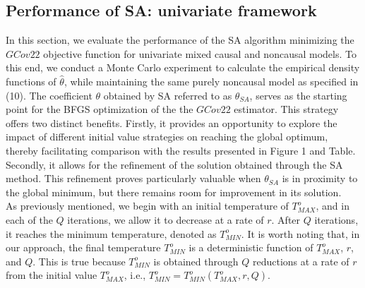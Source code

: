 \documentclass[<1p>]{elsarticle} %
\begin{document}
\subsection{Performance of SA: univariate framework}
In this section, we evaluate the performance of the SA algorithm minimizing the $GCov22$ objective function for univariate mixed causal and noncausal models. To this end, we conduct a Monte Carlo experiment to calculate the empirical density functions of $\hat{\theta}$, while maintaining the same purely noncausal model as specified in (10). The coefficient $\theta$ obtained by SA referred to as $\theta_{SA}$, serves as the starting point for the BFGS optimization of the the $GCov22$ estimator. This strategy offers two distinct benefits. Firstly, it provides an opportunity to explore the impact of different initial value strategies on reaching the global optimum, thereby facilitating comparison with the results presented in Figure 1 and Table. Secondly, it allows for the refinement of the solution obtained through the SA method. This refinement proves particularly valuable when $\theta_{SA}$ is in proximity to the global minimum, but there remains room for improvement in its solution.\\
\indent  As previously mentioned, we begin with an initial temperature of $T^{o}_{MAX}$, and in each of the $Q$ iterations, we allow it to decrease at a rate of $r$. After $Q$ iterations, it reaches the minimum temperature, denoted as $T^{o}_{MIN}$. It is worth noting that, in our approach, the final temperature $T^{o}_{MIN}$ is a deterministic function of $T^{o}_{MAX}$, $r$, and $Q$. This is true because $T^{o}_{MIN}$ is obtained through $Q$ reductions at a rate of $r$ from the initial value $T^{o}_{MAX}$, i.e., $T^{o}_{MIN} = T^{o}_{MIN}(T^{o}_{MAX}, r, Q)$.\\
\end{document}
